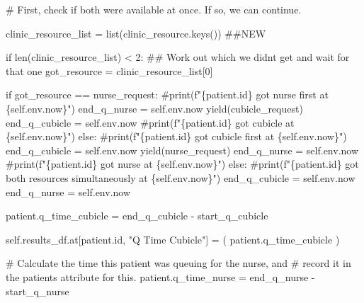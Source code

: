 \documentclass[
  letterpaper,
  DIV=11,
  numbers=noendperiod]{scrreprt}
\newenvironment{Shaded}{\begin{snugshade}}{\end{snugshade}}
\newcommand{\BuiltInTok}[1]{\textcolor[rgb]{0.00,0.23,0.31}{#1}}
\newcommand{\CommentTok}[1]{\textcolor[rgb]{0.37,0.37,0.37}{#1}}
\newcommand{\ControlFlowTok}[1]{\textcolor[rgb]{0.00,0.23,0.31}{#1}}
\newcommand{\DecValTok}[1]{\textcolor[rgb]{0.68,0.00,0.00}{#1}}
\newcommand{\NormalTok}[1]{\textcolor[rgb]{0.00,0.23,0.31}{#1}}
\newcommand{\OperatorTok}[1]{\textcolor[rgb]{0.37,0.37,0.37}{#1}}
\newcommand{\StringTok}[1]{\textcolor[rgb]{0.13,0.47,0.30}{#1}}
\newcommand{\VariableTok}[1]{\textcolor[rgb]{0.07,0.07,0.07}{#1}}
\begin{document}
\begin{tcolorbox}
\begin{Shaded}
\begin{Highlighting}[]
        \CommentTok{\# First, check if both were available at once. If so, we can continue.}

\NormalTok{        clinic\_resource\_list }\OperatorTok{=} \BuiltInTok{list}\NormalTok{(clinic\_resource.keys()) }\CommentTok{\#\#NEW}

        \ControlFlowTok{if} \BuiltInTok{len}\NormalTok{(clinic\_resource\_list) }\OperatorTok{\textless{}} \DecValTok{2}\NormalTok{:}
            \CommentTok{\#\# Work out which we didn\textquotesingle{}t get and wait for that one}
\NormalTok{            got\_resource }\OperatorTok{=}\NormalTok{ clinic\_resource\_list[}\DecValTok{0}\NormalTok{]}

            \ControlFlowTok{if}\NormalTok{ got\_resource }\OperatorTok{==}\NormalTok{ nurse\_request:}
                \CommentTok{\#print(f"\{patient.id\} got nurse first at \{self.env.now\}")}
\NormalTok{                end\_q\_nurse }\OperatorTok{=} \VariableTok{self}\NormalTok{.env.now}
                \ControlFlowTok{yield}\NormalTok{(cubicle\_request)}
\NormalTok{                end\_q\_cubicle }\OperatorTok{=} \VariableTok{self}\NormalTok{.env.now}
                \CommentTok{\#print(f"\{patient.id\} got cubicle at \{self.env.now\}")}
            \ControlFlowTok{else}\NormalTok{:}
                \CommentTok{\#print(f"\{patient.id\} got cubicle first at \{self.env.now\}")}
\NormalTok{                end\_q\_cubicle }\OperatorTok{=} \VariableTok{self}\NormalTok{.env.now}
                \ControlFlowTok{yield}\NormalTok{(nurse\_request)}
\NormalTok{                end\_q\_nurse }\OperatorTok{=} \VariableTok{self}\NormalTok{.env.now}
                \CommentTok{\#print(f"\{patient.id\} got nurse at \{self.env.now\}")}
        \ControlFlowTok{else}\NormalTok{:}
            \CommentTok{\#print(f"\{patient.id\} got both resources simultaneously at \{self.env.now\}")}
\NormalTok{            end\_q\_cubicle }\OperatorTok{=} \VariableTok{self}\NormalTok{.env.now}
\NormalTok{            end\_q\_nurse }\OperatorTok{=} \VariableTok{self}\NormalTok{.env.now}

\NormalTok{        patient.q\_time\_cubicle }\OperatorTok{=}\NormalTok{ end\_q\_cubicle }\OperatorTok{{-}}\NormalTok{ start\_q\_cubicle}

        \VariableTok{self}\NormalTok{.results\_df.at[patient.}\BuiltInTok{id}\NormalTok{, }\StringTok{"Q Time Cubicle"}\NormalTok{] }\OperatorTok{=}\NormalTok{ (}
\NormalTok{              patient.q\_time\_cubicle}
\NormalTok{        )}

        \CommentTok{\# Calculate the time this patient was queuing for the nurse, and}
        \CommentTok{\# record it in the patient\textquotesingle{}s attribute for this.}
\NormalTok{        patient.q\_time\_nurse }\OperatorTok{=}\NormalTok{ end\_q\_nurse }\OperatorTok{{-}}\NormalTok{ start\_q\_nurse}


\end{Highlighting}
\end{Shaded}
\end{tcolorbox}
\end{document}
